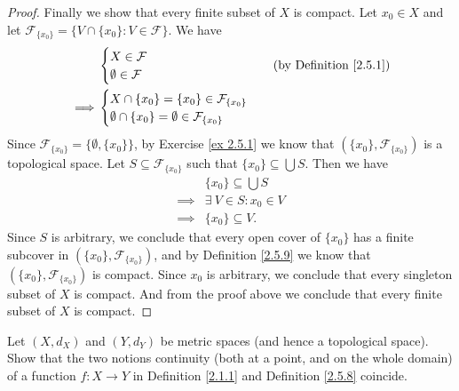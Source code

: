 \begin{proof}
    Finally we show that every finite subset of \(X\) is compact.
    Let \(x_0 \in X\) and let \(\mathcal{F}_{\{x_0\}} = \big\{V \cap \{x_0\} : V \in \mathcal{F}\big\}\).
    We have
    \begin{align*}
                 & \begin{cases}
            X \in \mathcal{F} \\
            \emptyset \in \mathcal{F}
        \end{cases} & \text{(by Definition \ref{2.5.1})} \\
        \implies & \begin{cases}
            X \cap \{x_0\} = \{x_0\} \in \mathcal{F}_{\{x_0\}} \\
            \emptyset \cap \{x_0\} = \emptyset \in \mathcal{F}_{\{x_0\}}
        \end{cases}
    \end{align*}
    Since \(\mathcal{F}_{\{x_0\}} = \big\{\emptyset, \{x_0\}\big\}\), by Exercise \ref{ex 2.5.1} we know that \((\{x_0\}, \mathcal{F}_{\{x_0\}})\) is a topological space.
    Let \(S \subseteq \mathcal{F}_{\{x_0\}}\) such that \(\{x_0\} \subseteq \bigcup S\).
    Then we have
    \begin{align*}
                 & \{x_0\} \subseteq \bigcup S  \\
        \implies & \exists\ V \in S : x_0 \in V \\
        \implies & \{x_0\} \subseteq V.
    \end{align*}
    Since \(S\) is arbitrary, we conclude that every open cover of \(\{x_0\}\) has a finite subcover in \((\{x_0\}, \mathcal{F}_{\{x_0\}})\), and by Definition \ref{2.5.9} we know that \((\{x_0\}, \mathcal{F}_{\{x_0\}})\) is compact.
    Since \(x_0\) is arbitrary, we conclude that every singleton subset of \(X\) is compact.
    And from the proof above we conclude that every finite subset of \(X\) is compact.
\end{proof}

\begin{exercise}\label{ex 2.5.15}
    Let \((X, d_X)\) and \((Y, d_Y)\) be metric spaces (and hence a topological space).
    Show that the two notions continuity (both at a point, and on the whole domain) of a function \(f : X \to Y\) in Definition \ref{2.1.1} and Definition \ref{2.5.8} coincide.
\end{exercise}

